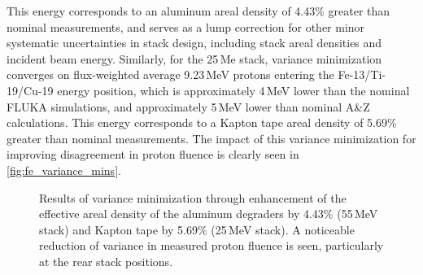 This energy corresponds to an aluminum areal density of 4.43\% greater than nominal measurements, and serves as a lump correction for other minor systematic uncertainties in stack design, including stack areal densities and incident beam energy.
Similarly, for the 25\,Me stack, variance minimization converges on  flux-weighted average 9.23\,MeV protons entering the Fe-13/Ti-19/Cu-19 energy position, which is approximately 4\,MeV lower than the nominal FLUKA simulations, and approximately 5\,MeV lower than nominal A\&Z calculations.
This energy corresponds to a Kapton tape areal density of 5.69\% greater than nominal measurements.
The impact of this variance minimization for improving disagreement in proton fluence is  clearly  seen in   \autoref{fig:fe_variance_mins}.




\begin{figure}
    \centering
    \caption{Results of variance minimization through enhancement of the effective areal density of the  aluminum degraders by 4.43\% (55\,MeV stack) and Kapton tape by 5.69\% (25\,MeV stack). A noticeable reduction of variance in measured proton fluence is seen,  particularly at the  rear stack positions.} 
     \label{fig:fe_variance_mins}
\end{figure}



